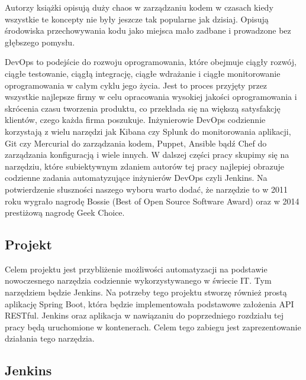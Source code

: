 Autorzy książki opisują duży chaos w zarządzaniu kodem w czasach kiedy wszystkie te koncepty nie były jeszcze tak popularne jak dzisiaj. Opisują środowiska przechowywania kodu jako miejsca mało zadbane i prowadzone bez głębszego pomysłu.

DevOps to podejście do rozwoju oprogramowania, które obejmuje ciągły rozwój, ciągłe testowanie, ciągłą integrację, ciągłe wdrażanie i ciągłe monitorowanie oprogramowania w całym cyklu jego życia. Jest to proces przyjęty przez wszystkie najlepsze firmy w celu opracowania wysokiej jakości oprogramowania i skrócenia czasu tworzenia produktu, co przekłada się na większą satysfakcję klientów, czego każda firma poszukuje.
Inżynierowie DevOps codziennie korzystają z wielu narzędzi jak Kibana czy Splunk do monitorowania aplikacji, Git czy Mercurial do zarządzania kodem, Puppet, Ansible bądź Chef do zarządzania konfiguracją i wiele innych. 
W dalszej części pracy skupimy się na narzędziu, które subiektywnym zdaniem autorów tej pracy najlepiej obrazuje codzienne zadania automatyzujące inżynierów DevOps czyli Jenkins.
Na potwierdzenie słuszności naszego wyboru warto dodać, że narzędzie to w 2011 roku wygrało nagrodę Bossie (Best of Open Source Software Award) oraz w 2014 prestiżową nagrodę Geek Choice.  

\subsection{Projekt}

Celem projektu jest przybliżenie możliwości automatyzacji na podstawie nowoczesnego narzędzia codziennie wykorzystywanego w świecie IT. Tym narzędziem będzie Jenkins. 
Na potrzeby tego projektu stworzę również prostą aplikację Spring Boot, która będzie implementowała podstawowe założenia API RESTful. Jenkins oraz aplikacja w nawiązaniu do poprzedniego rozdziału tej pracy będą uruchomione w kontenerach. Celem tego zabiegu jest zaprezentowanie działania tego narzędzia. 

\subsection{Jenkins}

